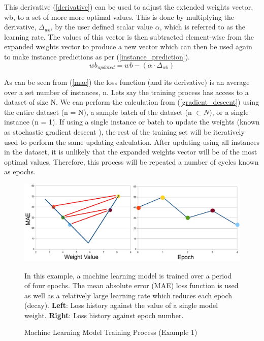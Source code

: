 \noindent
This derivative (\ref{derivative}) can be used to adjust the extended weights vector, wb, to a set of more more optimal values. This is done by multiplying the derivative, $\Delta_{wb}$, by the user defined scalar value $\alpha$, which is referred to as the learning rate. The values of this vector is then subtracted element-wise from the expanded weights vector to produce a new vector which can then be used again to make instance predictions as per (\ref{instance_prediction}). \\
 
 \begin{equation} \label{gradient_descent}
 	wb_{updated} = wb - (\alpha \cdot \Delta_{wb})
 \end{equation}
 
 \noindent
As can be seen from (\ref{mae}) the loss function (and its derivative) is an average over a set number of instances, n. Lets say the training process has access to a dataset of size N. We can perform the calculation from (\ref{gradient_descent})  using the entire dataset (n = N), a sample batch of the dataset (n $\subset N$), or a single instance (n = 1). If using a single instance or batch to update the weights (known as stochastic gradient descent \cite{ketkar2017stochastic}), the rest of the training set will be iteratively used to perform the same updating calculation. After updating using all instances in the dataset, it is unlikely that the expanded weights vector will be of the most optimal values.  Therefore, this process will be repeated a number of cycles known as epochs.

\begin{figure}[h]
	\centering
	\includegraphics[scale=0.35]{Figures/gradientDescent_mae_bigLR.jpg}
	\caption{Machine Learning Model Training Process (Example 1)} {In this example, a machine learning model is trained over a period of four epochs. The mean absolute error (MAE) loss function is used as well as a relatively large learning rate which reduces each epoch (decay). \textbf{Left}: Loss history against the value of a single model weight.  \textbf{Right}: Loss history against epoch number.}
	\label{fig:GD_maeBigLR}
\end{figure}

